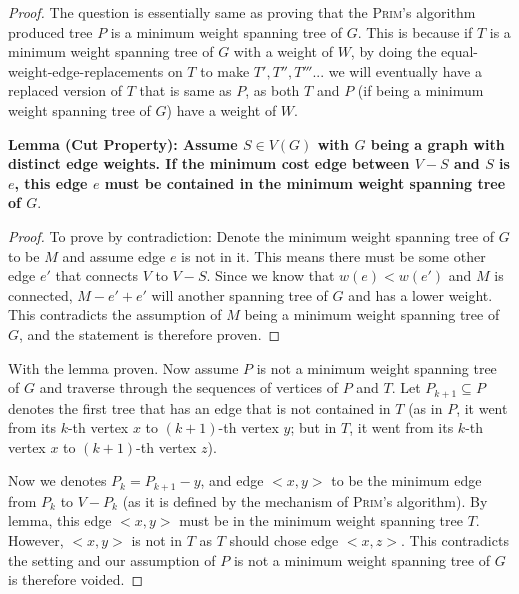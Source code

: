 \documentclass[11pt]{article}
\begin{document}
\begin{proof}

The question is essentially same as proving that the \textsc{Prim}'s algorithm produced tree $P$ is a minimum weight spanning tree of $G$. This is because if $T$ is a minimum weight spanning tree of $G$ with a weight of $W$, by doing the equal-weight-edge-replacements on $T$ to make $T', T'', T'''$... we will eventually have a replaced version of $T$ that is same as $P$, as both $T$ and $P$ (if being a minimum weight spanning tree of $G$) have a weight of $W$.

\leavevmode\newline


    \begin{adjustwidth}{1cm}{}

    \textbf{Lemma (Cut Property): Assume $S \in V(G)$ with $G$ being a graph with distinct edge weights. If the minimum cost edge between $V-S$ and $S$ is $e$, this edge $e$ must be contained in the minimum weight spanning tree of $G$}.\newline
    \begin{proof}
    To prove by contradiction: Denote the minimum weight spanning tree of $G$ to be $M$ and assume edge $e$ is not in it. This means there must be some other edge $e'$ that connects $V$ to $V-S$. Since we know that $w(e) < w(e')$ and $M$ is connected, $M - e' + e'$ will another spanning tree of $G$ and has a lower weight. This contradicts the assumption of $M$ being a minimum weight spanning tree of $G$, and the statement is therefore proven.
    \end{proof}
    \end{adjustwidth}

With the lemma proven. Now assume $P$ is not a minimum weight spanning tree of $G$ and traverse through the sequences of vertices of $P$ and $T$. Let $P_{k+1} \subseteq P$ denotes the first tree that has an edge that is not contained in $T$ (as in $P$, it went from its $k$-th vertex $x$ to $(k+1)$-th vertex $y$; but in $T$, it went from its $k$-th vertex $x$ to $(k+1)$-th vertex $z$). \newline

Now we denotes $P_k = P_{k+1} - y$, and edge $<x, y>$ to be the minimum edge from $P_k$ to $V - P_k$ (as it is defined by the mechanism of \textsc{Prim}'s algorithm). By lemma, this edge $<x, y>$ must be in the minimum weight spanning tree $T$. However, $<x, y>$ is not in $T$ as $T$ should chose edge $<x, z>$. This contradicts the setting and our assumption of $P$ is not a minimum weight spanning tree of $G$ is therefore voided.


\end{proof}
\end{document}

